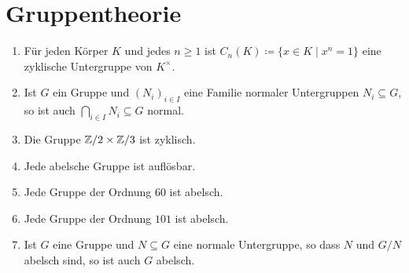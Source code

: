 \section{Gruppentheorie}




\begin{question}[subtitle = Wahr oder Falsch?]
  \begin{enumerate}
    \item
      Für jeden Körper $K$ und jedes $n \geq 1$ ist $C_n(K) \coloneqq \{x \in K \mid x^n = 1\}$ eine zyklische Untergruppe von $K^\times$.
    \item
      Ist $G$ ein Gruppe und $(N_i)_{i \in I}$ eine Familie normaler Untergruppen $N_i \subseteq G$, so ist auch $\bigcap_{i \in I} N_i \subseteq G$ normal.
    \item
      Die Gruppe $\mathbb{Z}/2 \times \mathbb{Z}/3$ ist zyklisch.
    \item
      Jede abelsche Gruppe ist auflösbar.
    \item
      Jede Gruppe der Ordnung $60$ ist abelsch.
    \item
      Jede Gruppe der Ordnung $101$ ist abelsch.
    \item
      Ist $G$ eine Gruppe und $N \subseteq G$ eine normale Untergruppe, so dass $N$ und $G/N$ abelsch sind, so ist auch $G$ abelsch.
  \end{enumerate}
\end{question}


